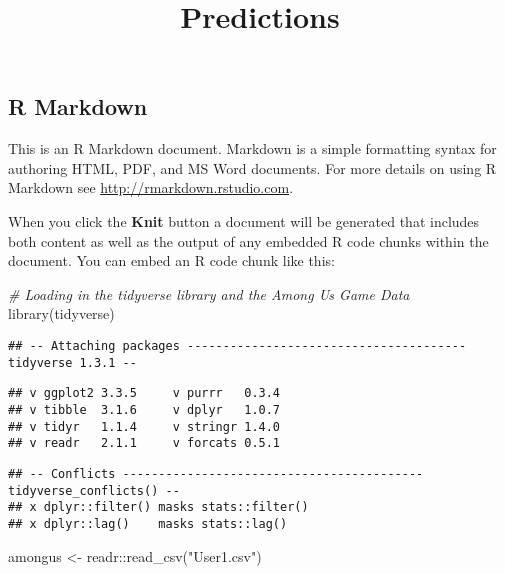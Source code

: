 \documentclass[
]{article}
\title{Predictions}
\author{}
\date{\vspace{-2.5em}}
\newenvironment{Shaded}{\begin{snugshade}}{\end{snugshade}}
\newcommand{\CommentTok}[1]{\textcolor[rgb]{0.56,0.35,0.01}{\textit{#1}}}
\newcommand{\FunctionTok}[1]{\textcolor[rgb]{0.00,0.00,0.00}{#1}}
\newcommand{\NormalTok}[1]{#1}
\newcommand{\OtherTok}[1]{\textcolor[rgb]{0.56,0.35,0.01}{#1}}
\newcommand{\SpecialCharTok}[1]{\textcolor[rgb]{0.00,0.00,0.00}{#1}}
\newcommand{\StringTok}[1]{\textcolor[rgb]{0.31,0.60,0.02}{#1}}
\begin{document}
\maketitle

\hypertarget{r-markdown}{%
\subsection{R Markdown}\label{r-markdown}}

This is an R Markdown document. Markdown is a simple formatting syntax
for authoring HTML, PDF, and MS Word documents. For more details on
using R Markdown see \url{http://rmarkdown.rstudio.com}.

When you click the \textbf{Knit} button a document will be generated
that includes both content as well as the output of any embedded R code
chunks within the document. You can embed an R code chunk like this:

\begin{Shaded}
\begin{Highlighting}[]
\CommentTok{\# Loading in the tidyverse library and the Among Us Game Data}
\FunctionTok{library}\NormalTok{(tidyverse)}
\end{Highlighting}
\end{Shaded}

\begin{verbatim}
## -- Attaching packages --------------------------------------- tidyverse 1.3.1 --
\end{verbatim}

\begin{verbatim}
## v ggplot2 3.3.5     v purrr   0.3.4
## v tibble  3.1.6     v dplyr   1.0.7
## v tidyr   1.1.4     v stringr 1.4.0
## v readr   2.1.1     v forcats 0.5.1
\end{verbatim}

\begin{verbatim}
## -- Conflicts ------------------------------------------ tidyverse_conflicts() --
## x dplyr::filter() masks stats::filter()
## x dplyr::lag()    masks stats::lag()
\end{verbatim}

\begin{Shaded}
\begin{Highlighting}[]
\NormalTok{amongus }\OtherTok{\textless{}{-}}\NormalTok{ readr}\SpecialCharTok{::}\FunctionTok{read\_csv}\NormalTok{(}\StringTok{"User1.csv"}\NormalTok{)}
\end{Highlighting}
\end{Shaded}
\end{document}
